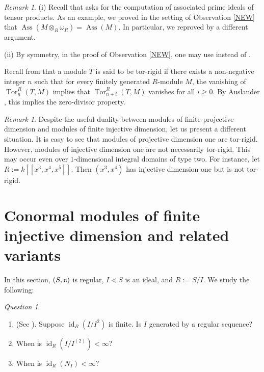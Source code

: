 \documentclass[10. pt,a4paper]{amsart}
\theoremstyle{definition}
\theoremstyle{remark}
\newtheorem{remark}[theorem]{Remark}\newtheorem{fact}[theorem]{Fact}
\newtheorem{question}[theorem]{Question}
\newcommand{\Ass}{\operatorname{Ass}}
\newcommand{\id}{\operatorname{id}}
\newcommand{\Tor}{\operatorname{Tor}}
\newcommand{\fn}{\frak{n}}
\begin{document}
\begin{remark}
	(i) Recall that \cite{moh3} asks for the computation of associated prime ideals of tensor products. As an example, we proved in the setting of Observation \ref{NEW} that $\Ass(M \otimes_R \omega_R) = \Ass(M)$. In particular, we reproved \cite[Corollary 4.6]{moh3} by a different argument.
	
	(ii) By symmetry, in the proof of Observation \ref{NEW}, one may use \cite[Corollary 4.6]{moh3} instead of \cite[Theorem 2.9]{sha}.
\end{remark}

Recall from \cite{au} that a module $T$ is said to be tor-rigid if there exists a non-negative integer $n$ such that for every finitely generated $R$-module $M$, the vanishing of $\Tor_n^R(T,M)$ implies that $\Tor_{n+i}^R(T,M)$ vanishes for all $i \geq 0$. By Auslander \cite[4.3]{au}, this implies the zero-divisor property.

\begin{remark}\label{NOT}
	Despite the useful duality between modules of finite projective dimension and modules of finite injective dimension, let us present a different situation. It is easy to see that modules of projective dimension one are tor-rigid. However, modules of injective dimension one are not necessarily tor-rigid. This may occur even over $1$-dimensional integral domains of type two. For instance, let $R := k[[x^3, x^4, x^5]]$. Then $(x^3, x^4)$ has injective dimension one but is not tor-rigid.
\end{remark}


\medskip
\section{Conormal modules of finite injective dimension  and related variants}

In this section, $(S,\fn)$ is regular, $I \lhd S$ is an ideal, and $R := S/I$. We study the following:

\begin{question}\label{q51}
	\begin{enumerate}
	\item[(i)] (See \cite{nano}). Suppose $\id_R(I/I^2)$ is finite. Is $I$ generated by a regular sequence?
	\item[(ii)] When is $\id_R(I/I^{(2)}) < \infty$? 
		\item[(iii)] When is $\id_R(N_I) < \infty$? 
\end{enumerate}	
\end{question}
\end{document}
